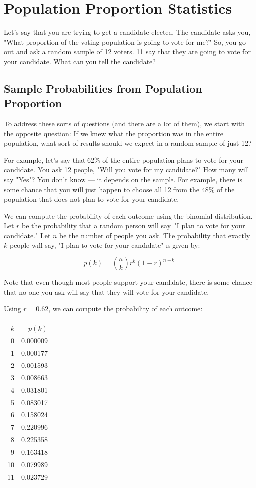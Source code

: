 \chapter{Population Proportion Statistics}

Let's say that you are trying to get a candidate elected.  The candidate asks you, "What proportion of the voting population is going to vote for me?"  
So, you go out and ask a random sample of 12 voters.  11 say that they are going to vote for your candidate.  What can you tell the candidate?

\section{Sample Probabilities from Population Proportion}

To address these sorts of questions (and there are a lot of them),  we start with the opposite question:  If we knew what the proportion was in the 
entire population,  what sort of results should we expect in a random sample of just 12?

For example,  let's say that 62\% of the entire population plans to vote for your candidate. You ask 12 people, "Will you vote for my candidate?"  How many will say "Yes"?  You don't know --- it depends
on the sample. For example,  there is some chance that you will just happen to choose all 12 from the 48\% of the population that does not plan to vote for your candidate.

We can compute the probability of each outcome using the binomial distribution. Let $r$ be the probability that a random person will say, "I plan to vote for your candidate."  Let $n$ be the number of people 
you ask.  The probability that exactly $k$ people will say, "I plan to vote for your candidate"  is given by:

$$p(k) =  \binom{n}{k}r^k(1-r)^{n-k}$$

Note that even though most people support your candidate,  there is some chance that no one you ask will say that they will vote for your candidate. 

Using $r=0.62$,  we can compute the probability of each outcome:


\begin{tabular}{r | r}
$k$  & $p(k)$ \\
\hline
0 & 0.000009 \\
1 & 0.000177 \\
2 & 0.001593 \\
3 & 0.008663 \\
4 & 0.031801 \\
5 & 0.083017 \\
6 & 0.158024 \\
7 & 0.220996 \\
8 & 0.225358 \\
9 & 0.163418 \\
10 & 0.079989 \\
11 & 0.023729 
\end{tabular}

